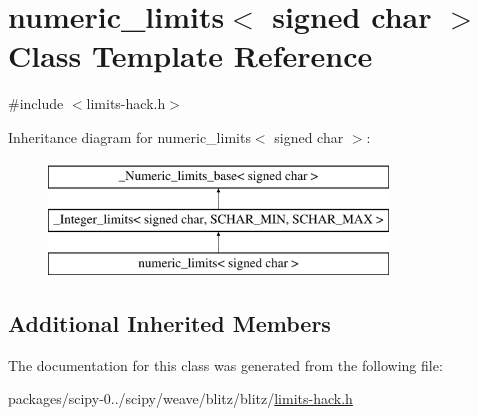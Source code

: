 \hypertarget{classnumeric__limits_3_01signed_01char_01_4}{}\section{numeric\+\_\+limits$<$ signed char $>$ Class Template Reference}
\label{classnumeric__limits_3_01signed_01char_01_4}


{\ttfamily \#include $<$limits-\/hack.\+h$>$}

Inheritance diagram for numeric\+\_\+limits$<$ signed char $>$\+:\begin{figure}[H]
\begin{center}
\leavevmode
\includegraphics[height=3.000000cm]{classnumeric__limits_3_01signed_01char_01_4}
\end{center}
\end{figure}
\subsection*{Additional Inherited Members}


The documentation for this class was generated from the following file\+:\begin{DoxyCompactItemize}
\item 
packages/scipy-\/0../scipy/weave/blitz/blitz/\hyperlink{limits-hack_8h}{limits-\/hack.\+h}\end{DoxyCompactItemize}
